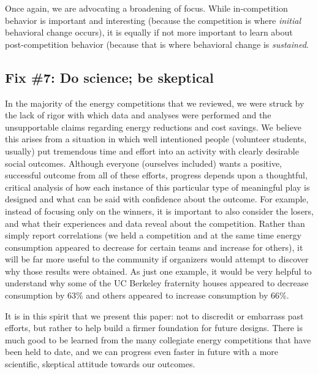 \documentclass[jou]{apa} %
\begin{document}
Once again, we are advocating a broadening of focus.   While in-competition behavior is
important and interesting (because the competition is where {\em initial} behavioral change
occurs), it is equally if not more important to learn about post-competition behavior
(because that is where behavioral change is {\em sustained}.

\subsection{Fix \#7: Do science; be skeptical}

In the majority of the energy competitions that we reviewed, we were struck by the lack of
rigor with which data and analyses were performed and the unsupportable claims regarding
energy reductions and cost savings.  We believe this arises from a situation in which well
intentioned people (volunteer students, usually) put tremendous time and effort into an
activity with clearly desirable social outcomes.  Although everyone (ourselves included)
wants a positive, successful outcome from all of these efforts, progress depends upon a
thoughtful, critical analysis of how each instance of this particular type of meaningful
play is designed and what can be said with confidence about the outcome.  For example,
instead of focusing only on the winners, it is important to also consider the losers, and
what their experiences and data reveal about the competition.  Rather than simply report
correlations (we held a competition and at the same time energy consumption appeared to
decrease for certain teams and increase for others), it will be far more useful to the
community if organizers would attempt to discover why those results were obtained.  As
just one example, it would be very helpful to understand why some of the UC Berkeley
fraternity houses appeared to decrease consumption by 63\% and others appeared to increase
consumption by 66\%. 

It is in this spirit that we present this paper: not to discredit or embarrass past
efforts, but rather to help build a firmer foundation for future designs.  There is much
good to be learned from the many collegiate energy competitions that have been held to
date, and we can progress even faster in future with a more scientific, skeptical attitude
towards our outcomes. 


\end{document}

